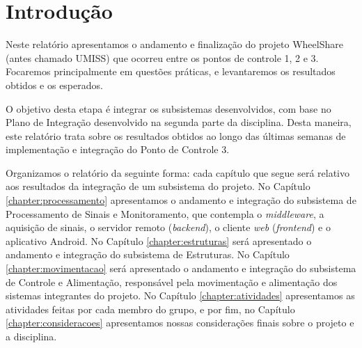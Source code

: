 \chapter{Introdução}

Neste relatório apresentamos o andamento e finalização do projeto WheelShare
(antes chamado UMISS) que ocorreu entre os pontos de controle 1, 2 e 3.
Focaremos principalmente em questões práticas, e levantaremos os resultados
obtidos e os esperados.

O objetivo desta etapa é integrar os subsistemas desenvolvidos, com base no
Plano de Integração desenvolvido na segunda parte da disciplina. Desta
maneira, este relatório trata sobre os resultados obtidos ao longo das últimas
semanas de implementação e integração do Ponto de Controle 3.

Organizamos o relatório da seguinte forma: cada capítulo que segue será relativo
aos resultados da integração de um subsistema do projeto. No Capítulo
\ref{chapter:processamento} apresentamos o andamento e integração do subsistema
de Processamento de Sinais e Monitoramento, que contempla o \textit{middleware},
a aquisição de sinais, o servidor remoto (\textit{backend}), o cliente \textit{web}
(\textit{frontend}) e o aplicativo Android. No Capítulo \ref{chapter:estruturas}
será apresentado o andamento e integração do subsistema de Estruturas. No
Capítulo \ref{chapter:movimentacao} será apresentado o andamento e integração do
subsistema de Controle e Alimentação, responsável pela movimentação e
alimentação dos sistemas integrantes do projeto. No Capítulo
\ref{chapter:atividades} apresentamos as atividades feitas por cada membro do
grupo, e por fim, no Capítulo \ref{chapter:consideracoes} apresentamos nossas
considerações finais sobre o projeto e a disciplina.


